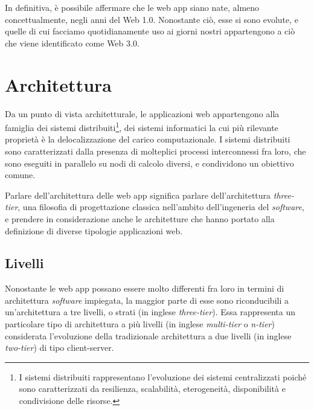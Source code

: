 In definitiva, è possibile affermare che le web app siano nate, almeno concettualmente, negli anni del Web 1.0. Nonostante ciò, esse si sono evolute, e quelle di cui facciamo quotidianamente uso ai giorni nostri appartengono a ciò che viene identificato come Web 3.0.

\section{Architettura}
\label{subec:Architettura}
Da un punto di vista architetturale, le applicazioni web appartengono alla famiglia dei sistemi distribuiti\footnote{I sistemi distribuiti rappresentano l'evoluzione dei sistemi centralizzati poiché sono caratterizzati da resilienza, scalabilità, eterogeneità, disponibilità e condivisione delle risorse.}, dei sistemi informatici la cui più rilevante proprietà è la delocalizzazione del carico computazionale. I sistemi distribuiti sono caratterizzati dalla presenza di molteplici processi interconnessi fra loro, che sono eseguiti in parallelo su nodi di calcolo diversi, e condividono un obiettivo comune. 

Parlare dell'architettura delle web app significa parlare dell'architettura \textit{three-tier}, una filosofia di progettazione classica nell'ambito dell'ingeneria del \textit{software}, e prendere in considerazione anche le architetture che hanno portato alla definizione di diverse tipologie applicazioni web.

\subsection{Livelli}
Nonostante le web app possano essere molto differenti fra loro in termini di architettura \textit{software} impiegata, la maggior parte di esse sono riconducibili a un'architettura a tre livelli, o strati (in inglese \textit{three-tier}). Essa rappresenta un particolare tipo di architettura a più livelli (in inglese \textit{multi-tier} o \textit{n-tier}) considerata l'evoluzione della tradizionale architettura a due livelli (in inglese \textit{two-tier}) di tipo client-server.

